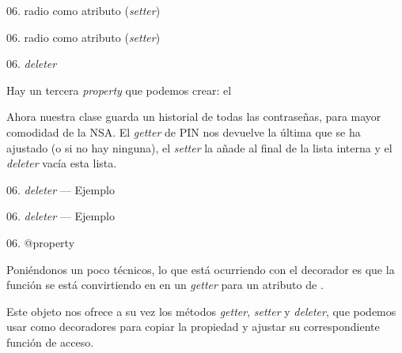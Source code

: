 \begin{frame}{06. radio como atributo (\textit{setter})}
  \scriptsize
\end{frame}

\begin{frame}{06. radio como atributo (\textit{setter})}
  \footnotesize
\end{frame}

\begin{frame}{06. \textit{deleter}}
  \begin{block}{}
    \centering
    Hay un tercera \textit{property} que podemos crear: el 
  \end{block}

  \begin{center}
    \small
    Ahora nuestra clase  guarda un historial de
    todas las contraseñas, para mayor comodidad de la NSA. El
    \textit{getter} de PIN nos devuelve la última que se ha ajustado
    (o  si no hay ninguna), el \textit{setter} la
    añade al final de la lista interna y el \textit{deleter} vacía
    esta lista.
  \end{center}
\end{frame}

\begin{frame}{06. \textit{deleter} — Ejemplo}
  \scriptsize
\end{frame}

\begin{frame}{06. \textit{deleter} — Ejemplo}
  \footnotesize
\end{frame}

\begin{frame}{06. @property}
  \begin{alertblock}{}
    \centering
    Poniéndonos un poco técnicos, lo que está ocurriendo con el
    decorador  es que la función se está
    convirtiendo en en un \textit{getter} para un atributo de
    .
  \end{alertblock}

  \begin{block}{}
    \small
    \centering
    Este objeto  nos ofrece a su vez los métodos
    \textit{getter}, \textit{setter} y \textit{deleter}, que podemos
    usar como decoradores para copiar la propiedad y ajustar su
    correspondiente función de acceso.
  \end{block}
\end{frame}

